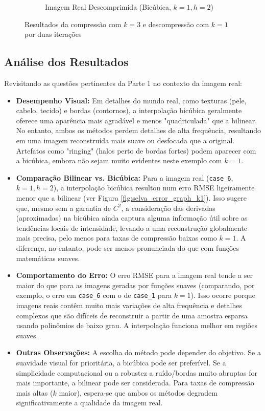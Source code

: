 \documentclass[12pt, a4paper]{article}
\begin{document}
\begin{figure}[H]
\begin{subfigure}[b]{0.45\textwidth}
        \caption{Imagem Real Descomprimida (Bicúbica, $k=1, h=2$)}
        \label{fig:selva_bicubic_k3}
    \end{subfigure}
    \caption{Resultados da compressão com $k=3$ e descompressão com $k=1$ por duas iterações}
    \label{fig:selva_results_k3}
\end{figure}

\subsection{Análise dos Resultados}
Revisitando as questões pertinentes da Parte 1 no contexto da imagem real:
\begin{itemize}
    \item \textbf{Desempenho Visual:} Em detalhes do mundo real, como texturas (pele, cabelo, tecido) e bordas (contornos), a interpolação bicúbica geralmente oferece uma aparência mais agradável e menos "quadriculada" que a bilinear. No entanto, ambos os métodos perdem detalhes de alta frequência, resultando em uma imagem reconstruída mais suave ou desfocada que a original. Artefatos como "ringing" (halos perto de bordas fortes) podem aparecer com a bicúbica, embora não sejam muito evidentes neste exemplo com $k=1$.
    \item \textbf{Comparação Bilinear vs. Bicúbica:} Para a imagem real (\texttt{case\_6}, $k=1, h=2$), a interpolação bicúbica resultou num erro RMSE ligeiramente menor que a bilinear (ver Figura \ref{fig:selva_error_graph_k1}). Isso sugere que, mesmo sem a garantia de $C^2$, a consideração das derivadas (aproximadas) na bicúbica ainda captura alguma informação útil sobre as tendências locais de intensidade, levando a uma reconstrução globalmente mais precisa, pelo menos para taxas de compressão baixas como $k=1$. A diferença, no entanto, pode ser menos pronunciada do que com funções matemáticas suaves.
    \item \textbf{Comportamento do Erro:} O erro RMSE para a imagem real tende a ser maior do que para as imagens geradas por funções suaves (comparando, por exemplo, o erro em \texttt{case\_6} com o de \texttt{case\_1} para $k=1$). Isso ocorre porque imagens reais contêm muito mais variações de alta frequência e detalhes complexos que são difíceis de reconstruir a partir de uma amostra esparsa usando polinômios de baixo grau. A interpolação funciona melhor em regiões suaves.
    \item \textbf{Outras Observações:} A escolha do método pode depender do objetivo. Se a suavidade visual for prioritária, a bicúbica pode ser preferível. Se a simplicidade computacional ou a robustez a ruído/bordas muito abruptas for mais importante, a bilinear pode ser considerada. Para taxas de compressão mais altas ($k$ maior), espera-se que ambos os métodos degradem significativamente a qualidade da imagem real.
\end{itemize}
\end{document}
